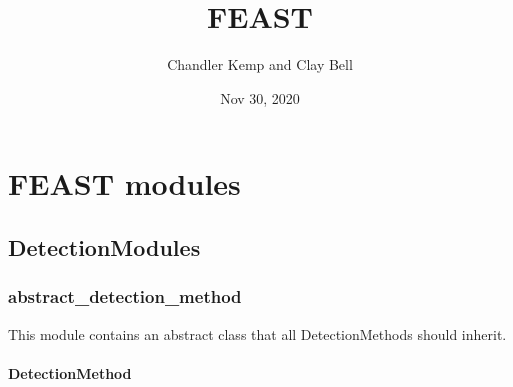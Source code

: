\documentclass[letterpaper,10pt,english]{sphinxmanual}
\title{FEAST}
\date{Nov 30, 2020}
\author{Chandler Kemp and Clay Bell}
\begin{document}
\pagestyle{empty}
\sphinxmaketitle
\pagestyle{plain}
\sphinxtableofcontents
\pagestyle{normal}
\label{\detokenize{index::doc}}

\begin{quote}
\end{quote}


\chapter{FEAST modules}
\label{\detokenize{index:feast-modules}}

\section{DetectionModules}
\label{\detokenize{index:detectionmodules}}

\subsection{abstract\_detection\_method}
\label{\detokenize{index:module-feast.DetectionModules.abstract_detection_method}}\label{\detokenize{index:abstract-detection-method}}
This module contains an abstract class that all DetectionMethods should inherit.


\subsubsection{DetectionMethod}
\label{\detokenize{index:detectionmethod}}
\end{document}
